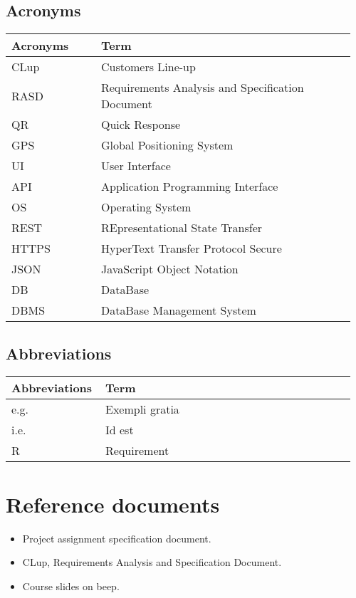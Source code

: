 \subsection{Acronyms}
\begin{center}
	\begin{tabular}{@{}p{0.25\linewidth} p{0.71\linewidth}@{}}
		\toprule
		\textbf{Acronyms} & \textbf{Term}\\
		\midrule
		CLup & Customers Line-up\\
		RASD & Requirements Analysis and Specification Document\\
		QR & Quick Response\\
		GPS & Global Positioning System\\
		UI & User Interface\\
		API & Application Programming Interface\\
		OS & Operating System\\
		REST & REpresentational State Transfer\\
		HTTPS & HyperText Transfer Protocol Secure\\
		JSON & JavaScript Object Notation\\	
		DB & DataBase\\
		DBMS & DataBase Management System\\
		\bottomrule
	\end{tabular}
\end{center}

\subsection{Abbreviations}
\begin{center}
	\begin{tabular}{@{}p{0.25\linewidth} p{0.71\linewidth}@{}}
		\toprule
		\textbf{Abbreviations} & \textbf{Term}\\
		\midrule
		e.g. & Exempli gratia\\
		i.e. & Id est\\
		R & Requirement\\		
		\bottomrule
	\end{tabular}
\end{center}

\section{Reference documents}
\begin{itemize}
	\item Project assignment specification document.
    \item CLup, Requirements Analysis and Specification Document.
	\item Course slides on beep.
\end{itemize}

